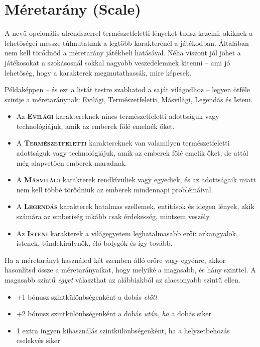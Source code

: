 \label{Méretarány}
\section[Méretarány]{Méretarány (Scale)}

A  nevű opcionális alrendszerrel természetfeletti lényeket tudsz kezelni, akiknek a lehetőségei messze túlmutatnak a legtöbb karakterénél a játékodban. Általában nem kell törődnöd a méretarány játékbeli hatásával. Néha viszont jól jöhet a játékosokat a szokásosnál sokkal nagyobb veszedelemnek kitenni -- ami jó lehetőség, hogy a karakterek megmutathassák, mire képesek.

Példaképpen -- és ezt a listát testre szabhatod a saját világodhoz -- legyen ötféle szintje a méretaránynak: Evilági, Természetfeletti, Másvilági, Legendás és Isteni.

\begin{itemize}
    \item Az \textsc{\textbf{Evilági}} karaktereknek nincs természetfeletti adottságuk vagy technológiájuk, amik az emberek fölé emelnék őket.
    \item A \textsc{\textbf{Természetfeletti}} karaktereknek van valamilyen természetfeletti adottságuk vagy technológiájuk, amik az emberek fölé emelik őket, de attól még alapvetően emberek maradnak.
    \item A \textsc{\textbf{Másvilági}} karakterek rendkívüliek vagy egyediek, és az adottságaik miatt nem kell többé törődniük az emberek mindennapi problémáival.
    \item A \textsc{\textbf{Legendás}} karakterek hatalmas szellemek, entitások és idegen lények, akik számára az emberiség inkább csak érdekesség, mintsem veszély.
    \item Az \textsc{\textbf{Isteni}} karakterek a világegyetem leghatalmasabb erői: arkangyalok, istenek, tündekirálynők, élő bolygók és így tovább.
\end{itemize}

Ha a méretarányt használod két szemben álló erőre vagy egyénre, akkor hasonlítsd össze a méretarányaikat, hogy melyiké a magasabb, és hány szinttel. A magasabb szintű \emph{egyet} választhat az alábbiakból az alacsonyabb szintű ellen.

\begin{itemize}
    \item +1 bónusz szintkülönbségenként a dobás \emph{előtt}
    \item +2 bónusz szintkülönbségenként a dobás \emph{után}, \emph{ha} a dobás siker
    \item 1 extra ingyen kihasználás szintkülönbségenként, ha a helyzetbehozás cselekvés siker
\end{itemize}

